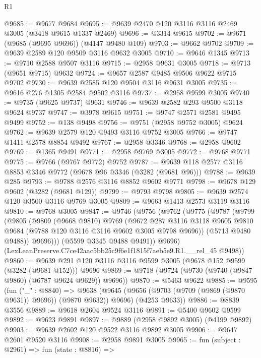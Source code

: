 \begin{lexlean}{R1}
\begin{coremodule}
@9685 := @9677 @9684
@9695 := @9639 @2470 @120 @3116 @3116 @2469 @3005 (@3418 @9615 @1337 @2469)
@9696 := @3314 @9615
@9702 := @9671 (@9685 (@9695 @9696)) (@4147 @9480 @109)
@9703 := @9662 @9702
@9709 := @9639 @2589 @120 @9509 @3116 @9632 @3005
@9710 := @9646 @1345
@9713 := @9710 @2588 @9507 @3116
@9715 := @2958 @9631 @3005
@9718 := @9713 (@9651 @9715) @9632
@9724 := @9657 @2587 @9485 @9506 @9622 @9715 @9702
@9730 := @9639 @2585 @120 @9504 @3116 @9631 @3005
@9735 := @9616 @276 @1305 @2584 @9502 @3116
@9737 := @2958 @9599 @3005
@9740 := @9735 (@9625 @9737) @9631
@9746 := @9639 @2582 @293 @9500 @3118 @9624 @9737
@9747 := @3978 @9615
@9751 := @9747 @2571 @2581 @9495 @9499
@9752 := @138 @9498
@9756 := @9751 (@2958 @9752 @3005) @9624
@9762 := @9639 @2579 @120 @9493 @3116 @9752 @3005
@9766 := @9747 @1411 @2578 @8854 @9492
@9767 := @2958 @3346
@9768 := @2958 @9602
@9769 := @1365 @9491
@9771 := @2958 @9769 @3005
@9772 := @9768 @9771
@9775 := @9766 (@9767 @9772) @9752
@9787 := @9639 @118 @2577 @3116 @8853 @3346 @9772 (@9678 @96 @3346 (@3282 (@9681 @96)))
@9788 := @9639 @285
@9793 := @9788 @2576 @3116 @8852 @9602 @9771
@9798 := @9678 @129 @9602 (@3282 (@9681 @129))
@9799 := @9793 @9798
@9805 := @9639 @2574 @120 @3500 @3116 @9769 @3005
@9809 := @9663 @1413 @2573 @3119 @3116
@9810 := @9768 @3005
@9847 := @9746
    (@9756
      (@9762
        (@9775
          (@9787
            (@9799
              (@9805
                (@9809
                  (@9668 @9810)
                  @9769
                  (@9672
                    @287
                    @3116
                    @3118
                    @9605
                    @9810
                    @9684
                    (@9788 @120 @3116 @3116 @9602 @3005 @9798 @9696))
                  (@5713 @9480 @9488))
                @9696)))
          (@5599 @3345 @9488 @9491))
        @9696)
      (LexLeanPreserve.C7ce42aac5bb25c9f6e1f1815f7aeb5e9.R1.__rel_45 @9498))
@9860 := @9639 @291 @120 @3116 @3116 @9599 @3005 (@9678 @152 @9599 (@3282 (@9681 @152))) @9696
@9869 := @9718 (@9724 (@9730 (@9740 (@9847 @9860) (@6787 @9624 @9629)) @9696))
@9870 := @5463 @9622
@9885 := @9595
    (fun ("_" : @8840) =>
    @9638
      (@9645 (@9656 (@9703 (@9709 (@9869 (@9870 @9631)) @9696)) (@9870 @9632)) @9696)
      (@4253 @9633))
@9886 := @8839 @3556
@9889 := @9618 @2604 @9524 @3116
@9891 := @5400 @9602 @9599
@9892 := @9623 @9891
@9897 := @9889 (@2958 @9892 @3005) (@4199 @9892)
@9903 := @9639 @2602 @120 @9522 @3116 @9892 @3005
@9906 := @9647 @2601 @9520 @3116
@9908 := @2958 @9891 @3005
@9965 := fun (subject : @2961) =>
  fun (state : @8816) =>

\end{coremodule}
\end{lexlean}
